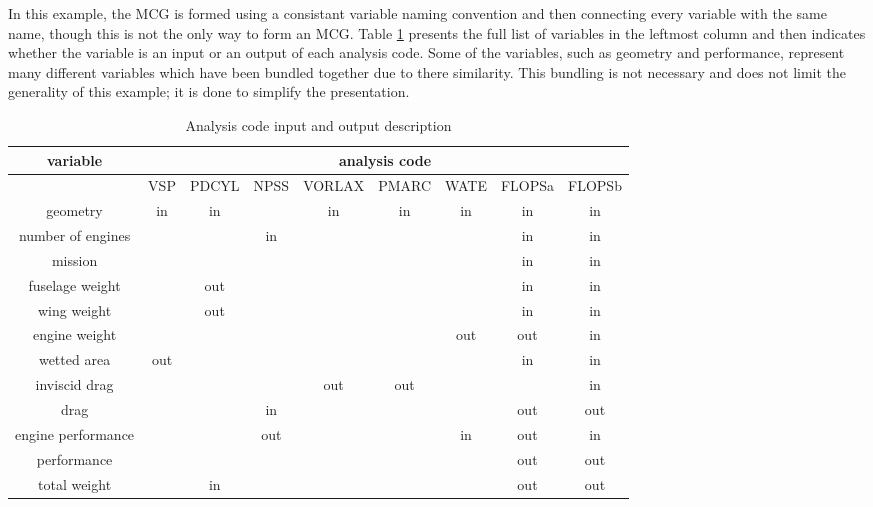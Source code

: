 	In this example, the MCG is formed using a consistant variable naming convention and then connecting every variable with the same name, though this is not the only way to form an MCG. 
	Table \ref{t:ins and outs} presents the full list of variables in the leftmost column and then indicates whether the variable is an input or an output of each analysis code. 
	Some of the variables, such as geometry and performance, represent many different variables which have been bundled together due to there similarity. 
	This bundling is not necessary and does not limit the generality of this example; it is done to simplify the presentation.
	\begin{table}[htb!]
	  \centering
	  \caption{Analysis code input and output description}
		\begin{tabular}{ccccccccc}
		\toprule
		variable & \multicolumn{8}{c}{analysis code} \\
		\midrule
			  & VSP   & PDCYL & NPSS  & VORLAX & PMARC & WATE  & FLOPSa & FLOPSb \\
		geometry & in    & in    &       & in    & in    & in    & in    & in \\
		number of engines &       &       & in    &       &       &       & in    & in \\
		mission &       &       &       &       &       &       & in    & in \\
		fuselage weight &       & out   &       &       &       &       & in    & in \\
		wing weight &       & out   &       &       &       &       & in    & in \\
		engine weight &       &       &       &       &       & out   & out   & in \\
		wetted area & out   &       &       &       &       &       & in    & in \\
		inviscid drag &       &       &       & out   & out   &       &       & in \\
		drag  &       &       & in    &       &       &       & out   & out \\
		engine performance &       &       & out   &       &       & in    & out   & in \\
		performance &       &       &       &       &       &       & out   & out \\
		total weight &       & in    &       &       &       &       & out   & out \\
		\bottomrule
		\end{tabular}
	  \label{t:ins and outs}
	\end{table}

